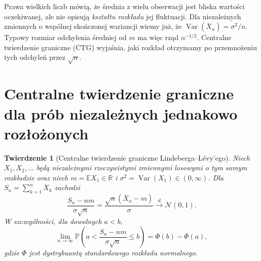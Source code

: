 \documentclass[11pt,a4paper,oneside]{report}
\numberwithin{equation}{chapter}
\theoremstyle{plain}
\newtheorem{twierdzenie}{Twierdzenie}[chapter]
\theoremstyle{definition}
\theoremstyle{remark}
\newcommand{\R}{\mathbb{R}}
\newcommand{\Prob}{\mathbb{P}}
\newcommand{\E}{\mathbb{E}}
\newcommand{\Var}{\operatorname{Var}}
\newcommand{\Normal}{\mathcal{N}}
\begin{document}
Prawa wielkich liczb mówią, że średnia z wielu obserwacji
jest bliska wartości oczekiwanej, ale nie opisują
\emph{kształtu rozkładu} jej fluktuacji. Dla niezależnych
zmiennych o wspólnej skończonej wariancji wiemy już, że
$\Var(\overline X_n)=\sigma^2/n$.
Typowy rozmiar odchylenia średniej od $m$ ma więc rząd
$n^{-1/2}$. Centralne twierdzenie graniczne (CTG)
wyjaśnia, jaki rozkład otrzymamy po przemnożeniu
tych odchyleń przez $\sqrt n$.

\section{Centralne twierdzenie graniczne dla prób niezależnych jednakowo rozłożonych}

\begin{twierdzenie}[Centralne twierdzenie graniczne Lindeberga--Lévy'ego]
Niech $X_1,X_2,\ldots$ będą niezależnymi rzeczywistymi
zmiennymi losowymi o tym samym rozkładzie oraz niech
$m=\E X_1\in\R$ i
$\sigma^2=\Var(X_1)\in(0,\infty)$.
Dla $S_n=\sum_{k=1}^nX_k$ zachodzi
\[
\frac{S_n-nm}{\sigma\sqrt n}
=\frac{\sqrt n(\overline X_n-m)}{\sigma}
\xrightarrow{d}\Normal(0,1).
\]
W szczególności, dla dowolnych $a<b$,
\[
\lim_{n\to\infty}
\Prob\!\left(a<\frac{S_n-nm}{\sigma\sqrt n}\leq b\right)
=\Phi(b)-\Phi(a),
\]
gdzie $\Phi$ jest dystrybuantą standardowego rozkładu
normalnego.
\end{twierdzenie}
\end{document}
